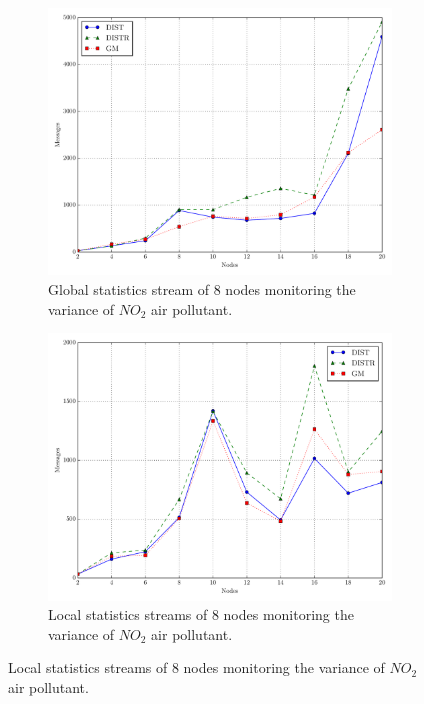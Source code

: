\begin{figure}[t!]
\centering
\begin{subfigure}[t]{0.31\textwidth}
\centering
\includegraphics[scale=0.28, trim=10.5cm 0 0 0]{img/matching_msg_linear.pdf}
\caption{Global statistics stream of 8 nodes monitoring the variance of $NO_2$ air pollutant.}
\end{subfigure}
\begin{subfigure}[t]{0.31\textwidth}
\centering
\includegraphics[scale=0.28, trim=4.5cm 0 0 0]{img/matching_msg_interweaving.pdf}
\caption{Local statistics streams of 8 nodes monitoring the variance of $NO_2$ air pollutant.} 

\end{subfigure}
\end{figure}
